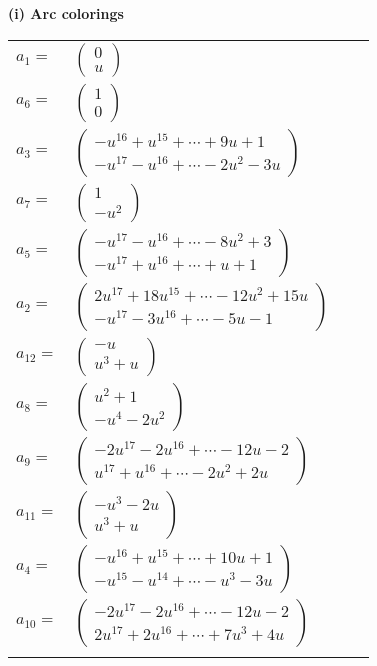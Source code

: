 \documentclass[1p]{elsarticle_modified}
\theoremstyle{definition}
\begin{document}
\flushleft \textbf{(i) Arc colorings}\\
\begin{tabular}{m{7pt} m{180pt} m{7pt} m{180pt} }
\flushright $a_{1}=$&$\begin{pmatrix}0\\u\end{pmatrix}$ \\
\flushright $a_{6}=$&$\begin{pmatrix}1\\0\end{pmatrix}$ \\
\flushright $a_{3}=$&$\begin{pmatrix}- u^{16}+u^{15}+\cdots+9 u+1\\- u^{17}- u^{16}+\cdots-2 u^2-3 u\end{pmatrix}$ \\
\flushright $a_{7}=$&$\begin{pmatrix}1\\- u^2\end{pmatrix}$ \\
\flushright $a_{5}=$&$\begin{pmatrix}- u^{17}- u^{16}+\cdots-8 u^2+3\\- u^{17}+u^{16}+\cdots+u+1\end{pmatrix}$ \\
\flushright $a_{2}=$&$\begin{pmatrix}2 u^{17}+18 u^{15}+\cdots-12 u^2+15 u\\- u^{17}-3 u^{16}+\cdots-5 u-1\end{pmatrix}$ \\
\flushright $a_{12}=$&$\begin{pmatrix}- u\\u^3+u\end{pmatrix}$ \\
\flushright $a_{8}=$&$\begin{pmatrix}u^2+1\\- u^4-2 u^2\end{pmatrix}$ \\
\flushright $a_{9}=$&$\begin{pmatrix}-2 u^{17}-2 u^{16}+\cdots-12 u-2\\u^{17}+u^{16}+\cdots-2 u^2+2 u\end{pmatrix}$ \\
\flushright $a_{11}=$&$\begin{pmatrix}- u^3-2 u\\u^3+u\end{pmatrix}$ \\
\flushright $a_{4}=$&$\begin{pmatrix}- u^{16}+u^{15}+\cdots+10 u+1\\- u^{15}- u^{14}+\cdots- u^3-3 u\end{pmatrix}$ \\
\flushright $a_{10}=$&$\begin{pmatrix}-2 u^{17}-2 u^{16}+\cdots-12 u-2\\2 u^{17}+2 u^{16}+\cdots+7 u^3+4 u\end{pmatrix}$\\&\end{tabular}
\end{document}
